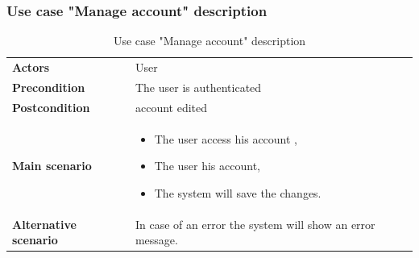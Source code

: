 \documentclass[12pt,a4paper]{report}
\begin{document}
\subsubsection*{Use case "Manage account" description}
\begin{table}[H]
	\begin{center}
		\captionsetup[table]{skip=10pt}
		\caption{Use case "Manage account" description}
		\setlength\doublerulesep{0.5pt}
\begin{tabular}{|  p{5cm}|  p{9cm}|}
	\rowcolor{LightCyan}
	
	\hline
	\multicolumn{2}{c}{Use case "Manage account"}\\
	\hline
	
	\textbf{Actors} &                        
	User 
	\\ \hline
	
	\textbf{Precondition} &                        
	The user is authenticated
	\\ \hline
	\textbf{Postcondition} &                        
	account edited
	\\ \hline
	
	\textbf{Main scenario} &                   
	\begin{itemize}
		\item The user access his account ,
		\item The user his account,
		\item The system will save the changes.
	\end{itemize}
	
	 
	\\ \hline
	
	\textbf{Alternative scenario} &                        
	In case of an error the system will show an error message.
	\\ \hline
	
	
\end{tabular}

\end{center}

\end{table}
\end{document}
